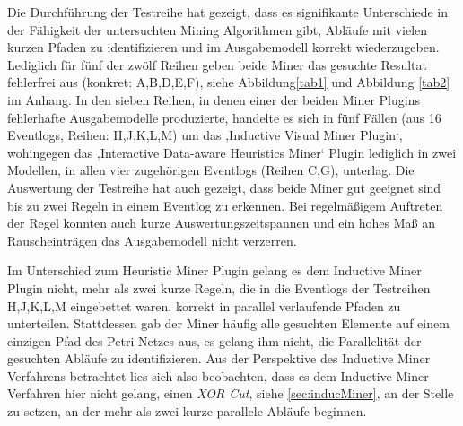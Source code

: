 Die Durchführung der Testreihe hat gezeigt, dass es signifikante Unterschiede in der Fähigkeit der untersuchten Mining Algorithmen gibt, Abläufe mit vielen kurzen Pfaden zu identifizieren und im Ausgabemodell korrekt wiederzugeben. Lediglich für fünf der zwölf Reihen geben beide Miner das gesuchte Resultat fehlerfrei aus (konkret: A,B,D,E,F), siehe Abbildung\ref{tab1} und Abbildung \ref{tab2} im Anhang. In den sieben Reihen, in denen einer der beiden Miner Plugins fehlerhafte Ausgabemodelle produzierte, handelte es sich in fünf Fällen (aus 16 Eventlogs, Reihen: H,J,K,L,M) um das ‚Inductive Visual Miner Plugin‘, wohingegen das ‚Interactive Data-aware Heuristics Miner‘ Plugin lediglich in zwei Modellen, in allen vier zugehörigen Eventlogs (Reihen C,G), unterlag. Die Auswertung der Testreihe hat auch gezeigt, dass beide Miner gut geeignet sind bis zu zwei Regeln in einem Eventlog zu erkennen. Bei regelmäßigem Auftreten der Regel konnten auch kurze Auswertungszeitspannen und ein hohes Maß an Rauscheinträgen das Ausgabemodell nicht verzerren.

Im Unterschied zum Heuristic Miner Plugin gelang es dem Inductive Miner Plugin nicht, mehr als zwei kurze Regeln, die in die Eventlogs der Testreihen H,J,K,L,M eingebettet waren, korrekt in parallel verlaufende Pfaden zu unterteilen. Stattdessen gab der Miner häufig alle gesuchten Elemente auf einem einzigen Pfad des Petri Netzes aus, es gelang ihm nicht, die Parallelität der gesuchten Abläufe zu identifizieren. 
Aus der Perspektive des Inductive Miner Verfahrens betrachtet lies sich also beobachten, dass es dem Inductive Miner Verfahren hier nicht gelang, einen \textit{XOR Cut}, siehe \ref{sec:inducMiner}, an der Stelle zu setzen, an der mehr als zwei kurze parallele Abläufe beginnen. 

